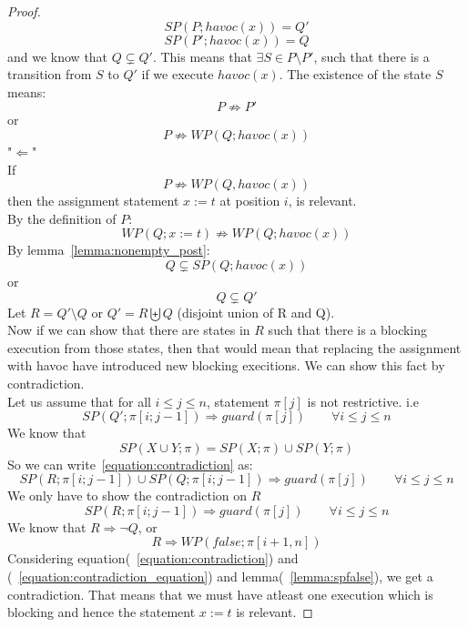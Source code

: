 \documentclass{article}
\newcommand{\limp}{\Rightarrow}
\begin{document}
\begin{proof}
$$SP(P; havoc(x)) = Q'$$
$$SP(P'; havoc(x)) = Q$$
and we know that $Q \subsetneq Q'$. This means that $\exists S \in P \setminus P'$, such that there is a transition from $S$ to $Q'$ if we execute $havoc(x)$. The existence of the state $S$ means:
$$P \not \limp P'$$
or
$$P \not \limp WP(Q; havoc(x))$$
"$\Leftarrow$"\\
If 
$$P \not \limp WP(Q,havoc(x))$$
then the assignment statement $x:=t$ at position $i$, is relevant.\\
By the definition of $P$:
$$WP(Q; x:=t) \not \limp WP(Q;havoc(x))$$
By lemma~\ref{lemma:nonempty_post}:
$$Q \subsetneq SP(Q; havoc(x))$$
or
$$Q \subsetneq Q'$$
Let $R = Q' \setminus Q$ or $Q' = R \biguplus Q$ (disjoint union of R and Q).\\
Now if we can show that there are states in $R$ such that there is a blocking execution from those states, then that would mean that replacing the assignment with havoc have introduced new blocking execitions. We can show this fact by contradiction. \\
Let us assume that for all $i \leq j \leq n$, statement $\pi[j]$ is not restrictive. i.e
\begin{equation}\label{equation:contradiction}
SP(Q'; \pi[i; j-1]) \limp guard(\pi[j]) \qquad \forall i \leq j \leq n
\end{equation}
We know that
$$SP(X \cup Y; \pi) = SP(X; \pi) \cup SP(Y; \pi)$$
So we can write~\ref{equation:contradiction} as:
$$SP(R; \pi[i; j-1]) \cup SP(Q;\pi[i; j-1]) \limp guard(\pi[j]) \qquad \forall i \leq j \leq n $$
We only have to show the contradiction on $R$
\begin{equation}\label{equation:contradiction_equation}
SP(R; \pi[i; j-1]) \limp guard(\pi[j]) \qquad \forall i \leq j \leq n
\end{equation}
We know that $R \limp \neg Q$, or
\begin{equation}
R \limp WP(false; \pi[i+1,n])
\end{equation}
Considering equation(~\ref{equation:contradiction}) and (~\ref{equation:contradiction_equation}) and lemma(~\ref{lemma:spfalse}), we get a contradiction. That means that we must have atleast one execution which is blocking and hence the statement $x:=t$ is relevant.
\end{proof}
\end{document}
